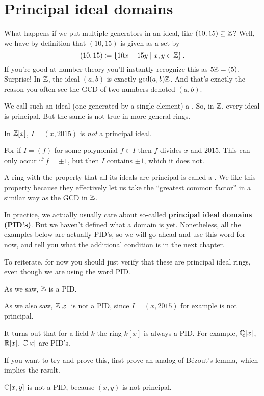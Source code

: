 \section{Principal ideal domains}

What happens if we put multiple generators in an ideal,
like $(10,15) \subseteq \mathbb Z$?
Well, we have by definition that $(10,15)$ is given as a set by
\[ (10,15) \coloneqq \left\{ 10x + 15y \mid x,y \in \mathbb Z \right\}.  \]
If you're good at number theory you'll instantly
recognize this as $5\mathbb Z = (5)$.
Surprise! In $\mathbb Z$, the ideal $(a,b)$ is exactly $\gcd(a,b) \mathbb Z$.
And that's exactly the reason you often see the GCD of two numbers denoted $(a,b)$.

We call such an ideal (one generated by a single element) a .
So, in $\mathbb Z$, every ideal is principal.
But the same is not true in more general rings.
\begin{example}
	In $\mathbb Z[x]$, $I = (x,2015)$ is \emph{not} a principal ideal.

	For if $I = (f)$ for some polynomial $f \in I$
	then $f$ divides $x$ and $2015$.
	This can only occur if $f = \pm 1$,
	but then $I$ contains $\pm1$, which it does not.
\end{example}
A ring with the property that all its ideals
are principal is called a .
We like this property because they effectively
let us take the ``greatest common factor''
in a similar way as the GCD in $\mathbb Z$.

In practice, we actually usually care about
so-called \textbf{principal ideal domains (PID's)}.
But we haven't defined what a domain is yet.
Nonetheless, all the examples below are actually PID's,
so we will go ahead and use this word for now,
and tell you what the additional condition is in the next chapter.

\begin{example}
	To reiterate, for now you should just verify
	that these are principal ideal rings,
	even though we are using the word PID.
	\begin{enumerate}[(a)]
		\ii As we saw, $\mathbb Z$ is a PID.

		\ii As we also saw, $\mathbb Z[x]$ is not a PID,
		since $I = (x,2015)$ for example is not principal.

		\ii It turns out that for a field $k$
		the ring $k[x]$ is always a PID.
		For example, $\mathbb Q[x]$, $\mathbb R[x]$, $\mathbb C[x]$ are PID's.

		If you want to try and prove this,
		first prove an analog of B\'{e}zout's lemma,
		which implies the result.

		\ii $\mathbb C[x,y]$ is not a PID, because $(x,y)$
		is not principal.
	\end{enumerate}
\end{example}

